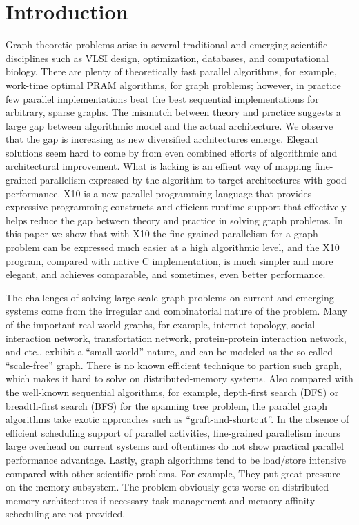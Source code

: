 
\section{Introduction}
\label{s:intr}

 Graph theoretic problems arise in several traditional and emerging scientific disciplines such as VLSI design, optimization, databases, and computational biology. There are plenty of theoretically fast parallel algorithms, for example, work-time optimal PRAM algorithms, for graph problems; however, in
 practice few parallel implementations beat the best sequential implementations for arbitrary, sparse
 graphs. The mismatch between theory and practice suggests a large gap between algorithmic model and the actual architecture. We observe that the gap is increasing as new diversified architectures emerge. Elegant solutions seem hard to come by from even combined efforts of algorithmic and architectural improvement. What is lacking is an effient way of mapping fine-grained parallelism expressed by the algorithm to target architectures with good performance. X10 is a new parallel programming language that provides expressive programming constructs and efficient runtime support that effectively helps reduce the gap between theory and practice in solving graph problems. In this paper we show that with X10 the fine-grained parallelism for a graph problem can be expressed much easier at a high algorithmic level, and the X10 program, compared with native C implementation, is much simpler and more elegant, and achieves comparable, and sometimes, even better performance. 

 The challenges of solving large-scale graph problems on current and emerging systems come from the irregular and combinatorial nature of the problem. Many of the important real world graphs, for example, internet topology, social interaction network, transfortation network, protein-protein interaction network, and etc., exhibit a ``small-world'' nature, and can be modeled as the so-called ``scale-free'' graph. There is no known efficient technique to partion such graph, which makes it hard to solve on distributed-memory systems. Also compared with the well-known sequential algorithms, for example, depth-first search (DFS) or breadth-first search (BFS) for the spanning tree problem, the parallel graph algorithms take exotic approaches such as ``graft-and-shortcut''. In the absence of efficient scheduling support of parallel activities, fine-grained parallelism incurs large overhead on current systems and oftentimes do not show practical parallel performance advantage. Lastly, graph algorithms tend to be load/store intensive compared with other scientific problems. For example,  They put great pressure on the memory subsystem. The problem obviously gets worse on distributed-memory architectures if necessary task management and memory affinity scheduling are not provided.  
 
